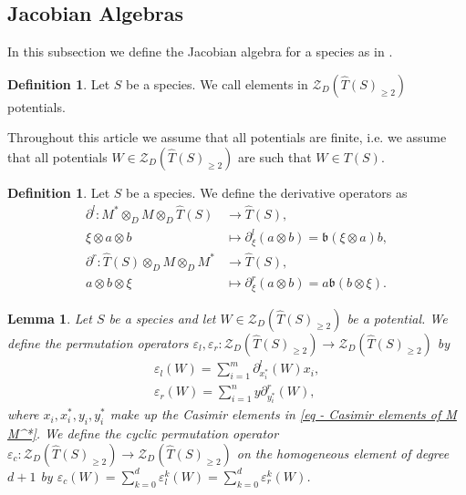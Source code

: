 \documentclass[a4paper, reqno]{amsart}
\newtheorem{mylemma}[mythm]{Lemma}
\theoremstyle{definition}
\newtheorem{mydef}[mythm]{Definition}
\renewcommand{\b}{\mathfrak{b}}
\begin{document}
\subsection{Jacobian Algebras}
In this subsection we define the Jacobian algebra for a species as in \cite{Nquefack2012PotentialsJacobian}.

\begin{mydef}\cite[Definition 3.5]{Nquefack2012PotentialsJacobian}
	Let $S$ be a species. We call elements in $\mathcal{Z}_D(\widehat{T}(S)_{\ge 2})$ potentials.
\end{mydef}

Throughout this article we assume that all potentials are finite, i.e. we assume that all potentials $W\in \mathcal{Z}_D(\widehat{T}(S)_{\ge 2})$ are such that $W\in T(S)$.

\begin{mydef}\cite[Proposition 3.2]{Nquefack2012PotentialsJacobian}\label{definition - derivative operators}
	Let $S$ be a species. We define the derivative operators as
	\begin{equation*}
		\begin{aligned}
			\partial^l: M^*\otimes_D M\otimes_D \widehat{T}(S) &\to \widehat{T}(S), \\
			\xi\otimes a\otimes b &\mapsto \partial^l_\xi(a\otimes b) = \b(\xi\otimes a)b, \\
			\partial^r: \widehat{T}(S) \otimes_D M\otimes_D M^* &\to \widehat{T}(S), \\
			a\otimes b\otimes \xi &\mapsto \partial^r_\xi(a\otimes b) = a\b(b\otimes \xi).
		\end{aligned}
	\end{equation*}
\end{mydef}

\begin{mylemma}\cite[Lemma 2.5, Proposition 3.2]{Nquefack2012PotentialsJacobian}
	Let $S$ be a species and let $W\in \mathcal{Z}_D(\widehat{T}(S)_{\ge 2})$ be a potential. We define the permutation operators $\varepsilon_l, \varepsilon_r: \mathcal{Z}_D(\widehat{T}(S)_{\ge 2})\to \mathcal{Z}_D(\widehat{T}(S)_{\ge 2})$ by
	\begin{equation*}
		\begin{aligned}
			\varepsilon_l(W) = \sum_{i=1}^m \partial^l_{x^*_i}(W)x_i, \\
			\varepsilon_r(W) = \sum_{i=1}^n y\partial^r_{y^*_i}(W),
		\end{aligned}
	\end{equation*}
	where $x_i, x^*_i, y_i, y^*_i$ make up the Casimir elements in \eqref{eq - Casimir elements of M M^*}. We define the cyclic permutation operator $\varepsilon_c: \mathcal{Z}_D(\widehat{T}(S)_{\ge 2})\to \mathcal{Z}_D(\widehat{T}(S)_{\ge 2})$ on the homogeneous element of degree $d+1$ by $\varepsilon_c(W) = \sum_{k=0}^d \varepsilon^k_l(W) = \sum_{k=0}^d \varepsilon^k_r(W)$.
\end{mylemma}
\end{document}
